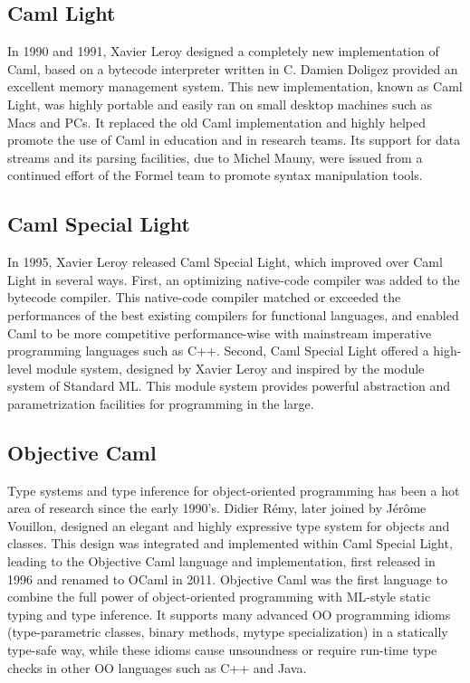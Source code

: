 \documentclass[14pt]{matmex-diploma-custom}
\begin{document}
\begin{itemize}
\begin{itemize}
\subsection{Caml Light}
In 1990 and 1991, Xavier Leroy designed a completely new implementation of Caml, based on a bytecode interpreter written in C. Damien Doligez provided an excellent memory management system. This new implementation, known as Caml Light, was highly portable and easily ran on small desktop machines such as Macs and PCs. It replaced the old Caml implementation and highly helped promote the use of Caml in education and in research teams. Its support for data streams and its parsing facilities, due to Michel Mauny, were issued from a continued effort of the Formel team to promote syntax manipulation tools.
\subsection{Caml Special Light}
In 1995, Xavier Leroy released Caml Special Light, which improved over Caml Light in several ways. First, an optimizing native-code compiler was added to the bytecode compiler. This native-code compiler matched or exceeded the performances of the best existing compilers for functional languages, and enabled Caml to be more competitive performance-wise with mainstream imperative programming languages such as C++. Second, Caml Special Light offered a high-level module system, designed by Xavier Leroy and inspired by the module system of Standard ML. This module system provides powerful abstraction and parametrization facilities for programming in the large.
\subsection{Objective Caml}
Type systems and type inference for object-oriented programming has been a hot area of research since the early 1990's. Didier Rémy, later joined by Jérôme Vouillon, designed an elegant and highly expressive type system for objects and classes. This design was integrated and implemented within Caml Special Light, leading to the Objective Caml language and implementation, first released in 1996 and renamed to OCaml in 2011. Objective Caml was the first language to combine the full power of object-oriented programming with ML-style static typing and type inference. It supports many advanced OO programming idioms (type-parametric classes, binary methods, mytype specialization) in a statically type-safe way, while these idioms cause unsoundness or require run-time type checks in other OO languages such as C++ and Java.


\end{itemize}
\end{itemize}
\end{document}
